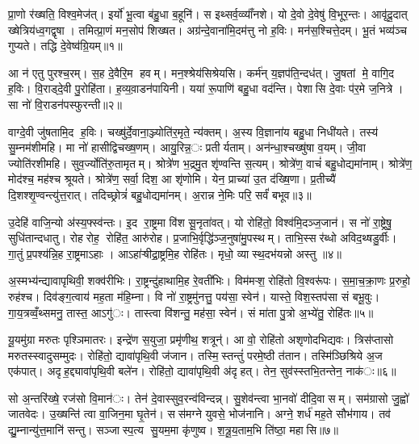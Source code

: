 प्रा॒णो र॑ख्षति॒ विश्व॒मेज॑त्। इर्यो॑ भू॒त्वा ब॑हु॒धा ब॒हूनि॑। स इथ्सर्व॒व्व्याँ॑नशे। यो दे॒वो दे॒वेषु॑ वि॒भूर॒न्तः। आवृ॑दू॒दात् ख्षेत्रिय॑ध्व॒गद्वृषा। तमित्प्रा॒णं मन॒सोप॑ शिख्षत। अग्र॑न्दे॒वाना॑मि॒दम॑त्तु नो ह॒विः। मन॑स॒श्चित्ते॒दम्। भू॒तं भव्य॑ञ्च गुप्यते। तद्धि दे॒वेष्व॑ग्रि॒यम्॥१॥

आ न॑ एतु पुरश्च॒रम्। स॒ह दे॒वैरि॒म हवम्। मन॒श्श्रेय॑सिश्रेयसि। कर्म॑न् य॒ज्ञप॑ति॒न्दध॑त्। जु॒षतां मे॒ वागि॒द ह॒विः। वि॒राड्दे॒वी पु॒रोहि॑ता। ह॒व्य॒वा़डन॑पायिनी। यया॑ रू॒पाणि॑ बहु॒धा वद॑न्ति। पेशासि दे॒वाः प॑र॒मे ज॒नित्रे। सा नो॑ वि॒राडन॑पस्फुरन्ती॥२॥

वाग्दे॒वी जु॑षतामि॒द ह॒विः। चख्षु॑र्दे॒वाना॒ञ्ज्योति॑र॒मृते॒ न्य॑क्तम्। अ॒स्य वि॒ज्ञाना॑य बहु॒धा निधी॑यते। तस्य॑ सु॒म्नम॑शीमहि। मा नो॑ हासीद्विचख्ष॒णम्। आयु॒रिन्न॒ः प्रतीर्यताम्। अन॑न्धा॒श्चख्षु॑षा व॒यम्। जी॒वा ज्योति॑रशीमहि। सुव॒र्ज्योति॑रु॒तामृतम्। श्रोत्रे॑ण भ॒द्रमु॒त शृ॑ण्वन्ति स॒त्यम्। श्रोत्रे॑ण॒ वाचं॑ बहु॒धोद्यमा॑नाम्। श्रोत्रे॑ण॒ मोद॑श्च॒ मह॑श्च श्रूयते। श्रोत्रे॑ण॒ सर्वा॒ दिश॒ आ शृ॑णोमि। येन॒ प्राच्या॑ उ॒त द॑ख्षि॒णा। प्र॒तीच्यै॑ दि॒शश्शृ॒ण्वन्त्यु॑त्त॒रात्। तदिच्छ्रोत्रं॑ बहु॒धोद्यमा॑नम्। अ॒रान्न ने॒मिः परि॒ सर्वं॑ बभूव॥३॥


उ॒देहि॑ वाजि॒न्यो अ॑स्य॒फ्स्व॑न्तः। इ॒द रा॒ष्ट्रमा वि॑श सू॒नृता॑वत्। यो रोहि॑तो॒ विश्व॑मि॒दञ्ज॒जान॑। स नो॑ रा॒ष्ट्रेषु॒ सुधि॑तान्दधातु। रोहरोह॒ रोहि॑त॒ आरु॑रोह। प्र॒जाभि॒र्वृद्धि॑ञ्ज॒नुषा॑मु॒पस्थम्। ताभि॒स्सर॑ब्धो अविद॒थ्षडु॒र्वीः। गा॒तुं प्र॒पश्य॑न्नि॒ह रा॒ष्ट्रमाऽहाः। आऽहा॑ऱ्षीद्रा॒ष्ट्रमि॒ह रोहि॑तः। मृधो॒ व्यास्थ॒दभ॑यन्नो अस्तु ॥४॥

अ॒स्मभ्य॑न्द्यावापृथिवी॒ शक्व॑रीभिः। रा॒ष्ट्रन्दु॑हाथामि॒ह रे॒वती॑भिः। विम॑मऱ्श॒ रोहि॑तो वि॒श्वरू॑पः। स॒मा॒च॒क्रा॒णः प्र॒रुहो॒ रुह॑श्च। दिव॑ङ्ग॒त्वाय॑ मह॒ता म॑हि॒म्ना। वि नो॑ रा॒ष्ट्रमु॑नत्तु॒ पय॑सा॒ स्वेन॑। यास्ते॒ विश॒स्तप॑सा सं बभू॒वुः। गा॒य॒त्रव्वँ॒थ्समनु॒ तास्त॒ आऽगु॑ः। तास्त्वा वि॑शन्तु॒ मह॑सा॒ स्वेन॑। सं मा॑ता पु॒त्रो अ॒भ्ये॑तु॒ रोहि॑तः॥५॥

यू॒यमु॑ग्रा मरुतः पृश्ञिमातरः। इन्द्रे॑ण स॒युजा॒ प्रमृ॑णीथ॒ शत्रून्॑। आ वो॒ रोहि॑तो अशृणोदभिद्यवः। त्रिस॑प्तासो मरुतस्स्वादुसम्मुदः। रोहि॑तो॒ द्यावा॑पृथि॒वी ज॑जान। तस्मि॒स्तन्तुं॑ परमे॒ष्ठी त॑तान। तस्मि॑ञ्छिश्रिये अ॒ज एक॑पात्। अदृह॒द्द्यावा॑पृथि॒वी बले॑न। रोहि॑तो॒ द्यावा॑पृथि॒वी अ॑दृहत्। तेन॒ सुव॑स्स्तभि॒तन्तेन॒ नाक॑ः॥६॥

सो अ॒न्तरि॑ख्षे॒ रज॑सो वि॒मान॑ः। तेन॑ दे॒वास्सुव॒रन्व॑विन्दन्न्। सु॒शेव॑न्त्वा भा॒नवो॑ दीदि॒वासम्। सम॑ग्रासो जु॒ह्वो॑ जातवेदः। उ॒ख्षन्ति॑ त्वा वा॒जिन॒मा घृ॒तेन॑। सस॑मग्ने युवसे॒ भोज॑नानि। अग्ने॒ शर्ध॑ मह॒ते सौभ॑गाय। तव॑ द्यु॒म्नान्यु॑त्त॒मानि॑ सन्तु। सञ्जास्प॒त्य सु॒यम॒मा कृ॑णुष्व। श॒त्रू॒य॒ताम॒भि ति॑ष्ठा॒ महासि॥७॥

